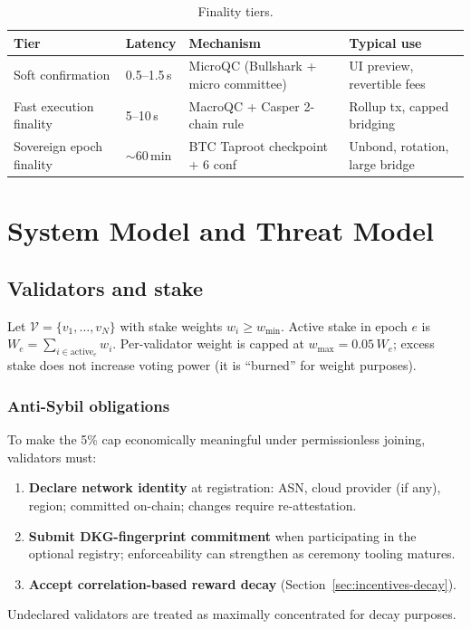 \documentclass[11pt,a4paper,twoside]{report}
\theoremstyle{definition}
\begin{document}
\begin{table}[htbp]
  \centering
  \caption{Finality tiers.}
  \label{tab:finality-tiers}
  \begin{tabular}{@{}p{3.6cm}p{2.2cm}p{4.2cm}p{4.0cm}@{}}
    \toprule
    \textbf{Tier} & \textbf{Latency} & \textbf{Mechanism} & \textbf{Typical use} \\
    \midrule
    Soft confirmation & 0.5--1.5\,s & MicroQC (Bullshark + micro committee) & UI preview, revertible fees \\
    Fast execution finality & 5--10\,s & MacroQC + Casper 2-chain rule & Rollup tx, capped bridging \\
    Sovereign epoch finality & $\sim$60\,min & BTC Taproot checkpoint + 6 conf & Unbond, rotation, large bridge \\
    \bottomrule
  \end{tabular}
\end{table}

\chapter{System Model and Threat Model}

\section{Validators and stake}
Let $\mathcal{V} = \{v_1,\ldots,v_N\}$ with stake weights $w_i \geq w_{\min}$. Active stake in epoch $e$ is $W_e = \sum_{i \in \mathrm{active}_e} w_i$. Per-validator weight is capped at $w_{\max} = 0.05\, W_e$; excess stake does not increase voting power (it is ``burned'' for weight purposes).


\subsection{Anti-Sybil obligations}
To make the 5\% cap economically meaningful under permissionless joining, validators must:
\begin{enumerate}[leftmargin=*]
  \item \textbf{Declare network identity} at registration: ASN, cloud provider (if any), region; committed on-chain; changes require re-attestation.
  \item \textbf{Submit DKG-fingerprint commitment} when participating in the optional registry; enforceability can strengthen as ceremony tooling matures.
  \item \textbf{Accept correlation-based reward decay} (Section~\ref{sec:incentives-decay}).
\end{enumerate}
Undeclared validators are treated as maximally concentrated for decay purposes.
\end{document}
